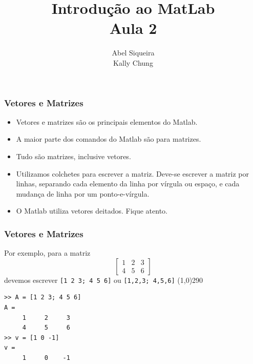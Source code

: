 \documentclass{beamer}
\title{Introdu\c{c}\~ao ao MatLab \\ Aula 2}
\author{Abel Siqueira \\ Kally Chung}
\date{}
\newcommand{\delim}{\line(1,0){290}}
\begin{document}
\frame{\titlepage}

\section[Vetores e Matrizes]{}
\begin{frame}[fragile]

  \frametitle{Vetores e Matrizes}

  \begin{itemize}
  \item<1-> Vetores e matrizes s\~ao os principais elementos do Matlab.
  \item<2-> A maior parte dos comandos do Matlab s\~ao para matrizes.
  \item<3-> Tudo s\~ao matrizes, inclusive vetores.
  \item<4-> Utilizamos colchetes para escrever a matriz. Deve-se escrever a matriz por linhas, separando cada elemento da linha por v\'irgula ou espa\c{c}o, e cada mudan\c{c}a de linha por um ponto-e-v\'irgula.
  \item<5-> O Matlab utiliza vetores deitados. Fique atento.
  \end{itemize}

\end{frame}

\begin{frame}[fragile]

\frametitle{Vetores e Matrizes}
Por exemplo, para a matriz
$$\left[\begin{array}{ccc}1 & 2 & 3 \\ 4 & 5 & 6\end{array}\right]$$
devemos escrever {\tt [1 2 3; 4 5 6]} ou {\tt [1,2,3; 4,5,6]}
\pause
\delim
\begin{verbatim}
>> A = [1 2 3; 4 5 6]
A =
     1     2     3
     4     5     6
>> v = [1 0 -1]
v =
     1     0    -1
\end{verbatim}

\end{frame}
\end{document}
